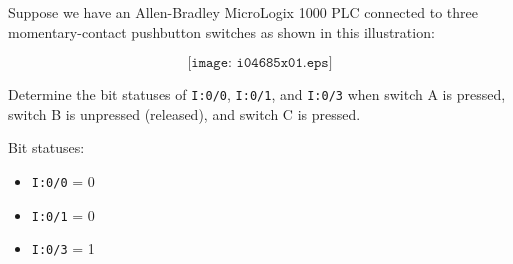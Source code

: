 

Suppose we have an Allen-Bradley MicroLogix 1000 PLC connected to three momentary-contact pushbutton switches as shown in this illustration:

$$\texttt{[image: i04685x01.eps]}$$

Determine the bit statuses of {\tt I:0/0}, {\tt I:0/1}, and {\tt I:0/3} when switch A is pressed, switch B is unpressed (released), and switch C is pressed.







Bit statuses:

\begin{itemize}
\item{} {\tt I:0/0} = 0
\item{} {\tt I:0/1} = 0
\item{} {\tt I:0/3} = 1
\end{itemize}











